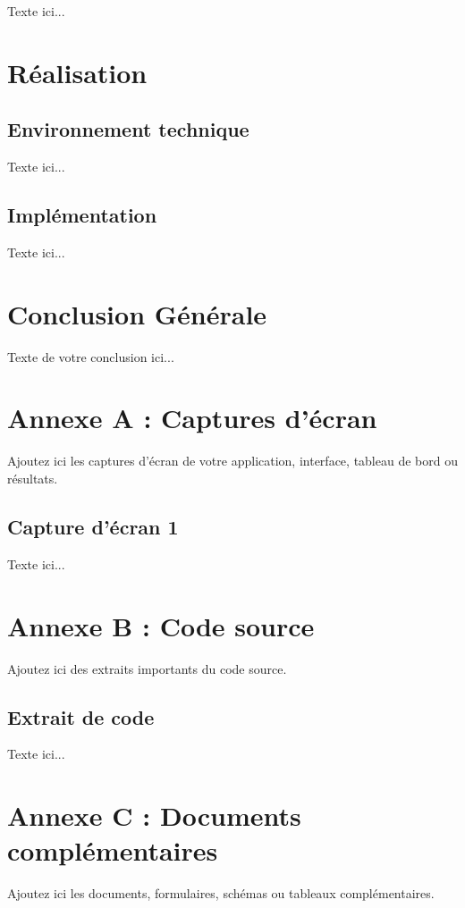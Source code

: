 \documentclass[12pt,a4paper,oneside]{report}
\begin{document}
Texte ici...

\chapter{Réalisation}

\section{Environnement technique}

Texte ici...

\section{Implémentation}

Texte ici...

\chapter*{Conclusion Générale}

Texte de votre conclusion ici...

\clearpage
\printbibliography[heading=bibintoc,title={Bibliographie}]

\clearpage
\appendix

\chapter{Annexe A : Captures d’écran}

Ajoutez ici les captures d’écran de votre application, interface, tableau de bord ou résultats.

\section{Capture d’écran 1}

Texte ici...

\chapter{Annexe B : Code source}

Ajoutez ici des extraits importants du code source.

\section{Extrait de code}

Texte ici...

\chapter{Annexe C : Documents complémentaires}

Ajoutez ici les documents, formulaires, schémas ou tableaux complémentaires.
\end{document}
